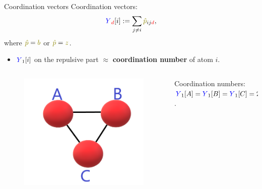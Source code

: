 \documentclass{beamer}
\begin{document}
\begin{frame}{Coordination vectors}
    Coordination vectors:
    \begin{equation}
        {\color{blue}Y}_{\color{red}d}[i] := \sum_{j\neq i}{\color{olive}\hat{p}}_{ij{\color{red}d}},
    \end{equation}
    where ${\color{olive}\hat{p}} = {\color{olive}b}$ or ${\color{olive}\hat{p}} = {\color{olive}z}$.
    \begin{itemize}
        \item ${\color{blue}Y}_1[i]$ on the repulsive part $\approx $ \textbf{coordination number} of atom $i$.
    \end{itemize}
    \begin{columns}
        \begin{column}{0.5\textwidth}
            \begin{figure}[H]
                \centering
                    \includegraphics[scale=0.3]{img/slide/triatom_covalent.png}
                \label{fig:triatom_covalent}
            \end{figure}
        \end{column}
        \begin{column}{0.5\textwidth}
            Coordination numbers: ${\color{blue}Y}_1[A] = {\color{blue}Y}_1[B] = {\color{blue}Y}_1[C] = 2$.
        \end{column}
    \end{columns}
\end{frame}
\end{document}
